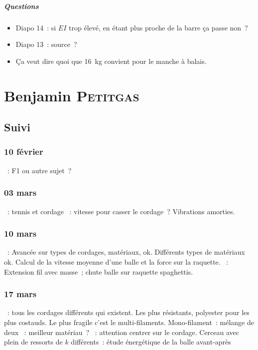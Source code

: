 \documentclass[a4paper, 11pt, final, garamond]{book}
\begin{document}
\paragraph*{Questions}
\begin{itemize}
  \item Diapo 14~: si $EI$ trop élevé, en étant plus proche de la barre ça passe
    non~?
  \item Diapo 13~: source~?
  \item Ça veut dire quoi que \SI{16}{kg} convient pour le manche à balais.
\end{itemize}

\chapter{Benjamin \textsc{Petitgas}}
\label{ch:benjamin}
\section{Suivi}
\subsection{10 février}
\begin{itemize}
    ~: F1 ou autre sujet~?
\end{itemize}

\subsection{03 mars}
\begin{itemize}
    ~: tennis et cordage
    ~: vitesse pour casser le cordage~? Vibrations amorties.
\end{itemize}

\subsection{10 mars}
\begin{itemize}
    ~: Avancée sur types de cordages, matériaux, ok. Différents
        types de matériaux ok. Calcul de la vitesse moyenne d'une balle et la
        force sur la raquette.
    ~: Extension fil avec masse~; chute balle sur raquette
        spaghettis.
\end{itemize}

\subsection{17 mars}
\begin{itemize}
    ~: tous les cordages différents qui existent. Les plus
        résistants, polyester pour les plus costauds. Le plus fragile c'est le
        multi-filaments. Mono-filament~: mélange de deux
    ~: meilleur matériau~?
    ~: attention centrer sur le cordage. Cerceau avec plein de
        ressorts de $k$ différents~: étude énergétique de la balle avant-après
\end{itemize}
\end{document}
